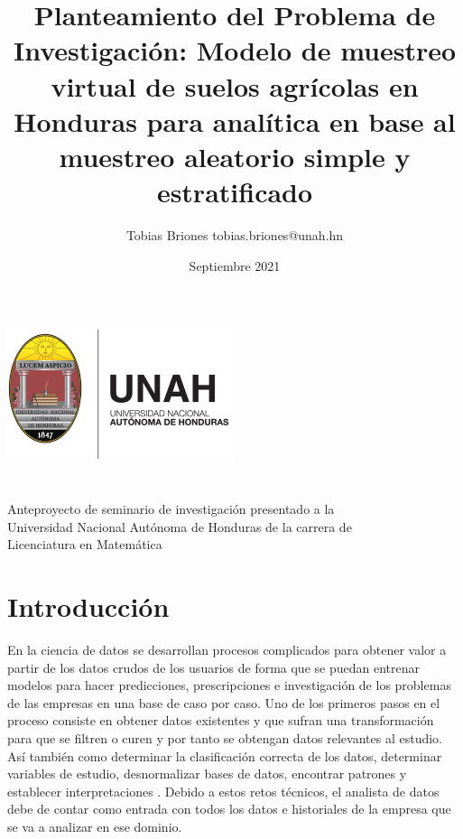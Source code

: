 \documentclass{report}
\title{Planteamiento del Problema de Investigación: Modelo de muestreo virtual de suelos agrícolas en Honduras para analítica en base al muestreo aleatorio simple y estratificado}
\author{Tobias Briones \bigbreak tobias.briones@unah.hn}
\date{Septiembre 2021}
\begin{document}
\makeatletter
    \begin{titlepage}
        \begin{center}
            \includegraphics[width=0.3\linewidth]{ref/logo-unah.png}\\[4ex]
            {\huge \bfseries \@title 
            \vspace{1cm}}\\[2ex]
            {\LARGE \@author}\\[50ex] 
            
            {\large
            Anteproyecto de seminario de investigación presentado a la\\
            Universidad Nacional Autónoma de Honduras de la carrera de\\
            Licenciatura en Matemática
            }\\[2ex]
            
            {\large \@date}
        \end{center}
    \end{titlepage}
\makeatother
\thispagestyle{empty}
\newpage

\thispagestyle{empty}
\tableofcontents
\newpage

\chapter{Introducción}

En la ciencia de datos se desarrollan procesos complicados para obtener valor a partir de los datos crudos de los usuarios de forma que se puedan entrenar modelos para hacer predicciones, prescripciones e investigación de los problemas de las empresas en una base de caso por caso. Uno de los primeros pasos en el proceso consiste en obtener datos existentes y que sufran una transformación para que se filtren o curen y por tanto se obtengan datos relevantes al estudio. Así también como determinar la clasificación correcta de los datos, determinar variables de estudio, desnormalizar bases de datos, encontrar patrones y establecer  interpretaciones \cite{university-of-wisconsin-data-science-2021}. Debido a estos retos técnicos, el analista de datos debe de contar como entrada con todos los datos e historiales de la empresa que se va a analizar en ese dominio.
\end{document}
